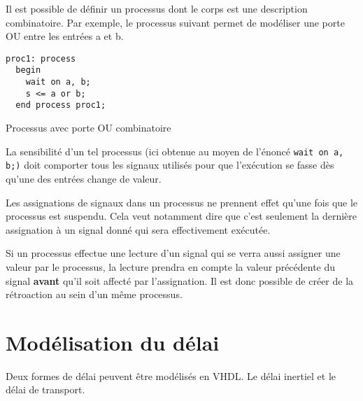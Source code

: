 \documentclass[letter, oneside]{book}
\begin{document}
Il est possible de définir un processus dont le corps est une
description combinatoire. Par exemple, le processus suivant permet de
modéliser une porte OU entre les entrées a et b. 

\begin{listing}[htbp]
\begin{verbatim}
proc1: process
  begin
    wait on a, b;
    s <= a or b;
  end process proc1;
\end{verbatim}
\caption{Processus avec porte OU combinatoire}
\end{listing}

La sensibilité d'un tel processus (ici obtenue au moyen de l'énoncé
\texttt{wait on a, b;)} doit comporter tous les signaux utilisés pour que
l'exécution se fasse dès qu'une des entrées change de valeur.

Les assignations de signaux dans un processus ne prennent effet qu'une
fois que le processus est suspendu. Cela veut notamment dire que c'est
seulement la dernière assignation à un signal donné qui sera
effectivement exécutée.

Si un processus effectue une lecture d'un signal qui se verra aussi
assigner une valeur par le processus, la lecture prendra en compte la
valeur précédente du signal \textbf{avant} qu'il soit affecté par
l'assignation. Il est donc possible de créer de la rétroaction au sein
d'un même processus.

\section{Modélisation du délai}
\label{sec:orgc7dc711}

Deux formes de délai peuvent être modélisés en VHDL. Le délai inertiel
et le délai de transport.
\end{document}
